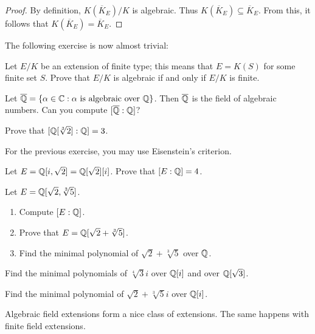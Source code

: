 \begin{proof}
    By definition, $K(\overline{K}_E)/K$ is algebraic. 
    Thus $K(\overline{K}_E)\subseteq\overline{K}_E$. From this, it follows that
    $K(\overline{K}_E)=\overline{K}_E$. 
\end{proof}

The following exercise is now almost trivial:

\begin{exercise}
    Let $E/K$ be an extension of finite type; this means 
    that  
    $E=K(S)$ for some finite
    set $S$.  
    Prove that $E/K$ is algebraic if and only if $E/K$ 
    is finite. 
\end{exercise}

Let $\overline{\mathbb{Q}}=\{\alpha\in\mathbb{C}:\alpha\text{ is algebraic over }\mathbb{Q}\}$. 
Then $\overline{\mathbb{Q}}$ is the field of algebraic numbers. 
Can you compute $[\overline{\mathbb{Q}}:\mathbb{Q}]$?

\begin{exercise}
    Prove that $[\mathbb{Q}[\sqrt[3]{2}]:\mathbb{Q}]=3$. 
\end{exercise}

For the previous exercise, you may use Eisenstein's criterion. 

\begin{exercise}
    Let $E=\mathbb{Q}[i,\sqrt{2}]=\mathbb{Q}[\sqrt{2}][i]$. Prove that $[E:\mathbb{Q}]=4$.  
\end{exercise}

\begin{exercise}
    Let $E=\mathbb{Q}[\sqrt{2},\sqrt[3]{5}]$. 
    \begin{enumerate}
        \item Compute $[E:\mathbb{Q}]$.
        \item Prove that $E=\mathbb{Q}[\sqrt{2}+\sqrt[3]{5}]$.
        \item Find the minimal polynomial of $\sqrt{2}+\sqrt[3]{5}$ over $\mathbb{Q}$. 
    \end{enumerate}
\end{exercise}

\begin{exercise}
    Find the minimal polynomials of $\sqrt[4]{3}i$ over $\mathbb{Q}[i]$ and over $\mathbb{Q}[\sqrt{3}]$. 
\end{exercise}

\begin{exercise}
    Find the minimal polynomial of $\sqrt{2}+\sqrt[3]{5}i$ over $\mathbb{Q}[i]$.
\end{exercise}

%
%
%
Algebraic field extensions form a nice class of extensions. The same happens
with finite field extensions. 

